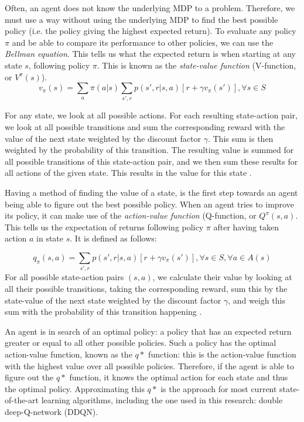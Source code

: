 Often, an agent does not know the underlying MDP to a problem. Therefore, we must use a way without using the underlying MDP to find the best possible policy (i.e. the policy giving the highest expected return). To evaluate any policy ${\pi}$ and be able to compare its performance to other policies, we can use the \emph{Bellman equation}. This tells us what the expected return is when starting at any state $s$, following policy $\pi$. This is known as the \emph{state-value function} (V-function, or $V^{\pi}(s)$).
\begin{equation}
v_\pi (s) = \sum_{a} \pi (a|s) \sum_{s', r} p(s', r|s,a)[r + \gamma v_\pi (s')], \forall s \in S
\end{equation} 

For any state, we look at all possible actions. For each resulting state-action pair, we look at all possible transitions and sum the corresponding reward with the value of the next state weighted by the discount factor $\gamma$. This sum is then weighted by the probability of this transition. The resulting value is summed for all possible transitions of this state-action pair, and we then sum these results for all actions of the given state. This results in the value for this state \cite[p. 73]{grokking}.

Having a method of finding the value of a state, is the first step towards an agent being able to figure out the best possible policy. When an agent tries to improve its policy, it can make use of the \emph{action-value function} (Q-function, or $Q^\pi (s, a)$. This tells us the expectation of returns following policy $\pi$ after having taken action $a$ in state $s$. It is defined as follows:

\begin{equation}
q_\pi (s,a) = \sum_{s', r} p(s', r|s,a)[r + \gamma v_\pi (s')], \forall s \in S, \forall a \in A(s)
\end{equation}
For all possible state-action pairs $(s,a)$, we calculate their value by looking at all their possible transitions, taking the corresponding reward, sum this by the state-value of the next state weighted by the discount factor $\gamma$, and weigh this sum with the probability of this transition happening \cite[p. 74]{grokking}.

An agent is in search of an optimal policy: a policy that has an expected return greater or equal to all other possible policies. Such a policy has the optimal action-value function, known as the $q*$ function: this is the action-value function with the highest value over all possible policies. Therefore, if the agent is able to figure out the $q*$ function, it knows the optimal action for each state and thus the optimal policy. Approximating this $q*$ is the approach for most current state-of-the-art learning algorithms, including the one used in this research: double deep-Q-network (DDQN). 

